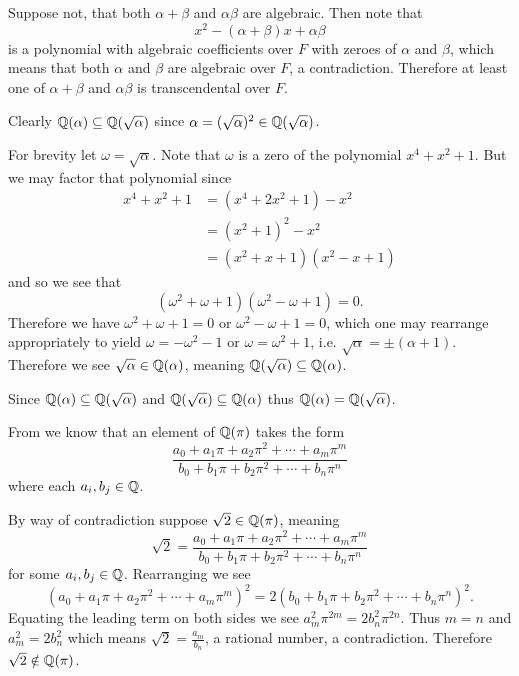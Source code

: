 \begin{questions}
\begin{partquestions}{\roman*}
        \item Suppose not, that both $\alpha + \beta$ and $\alpha\beta$ are algebraic. Then note that
        \[
            x^2 - (\alpha+\beta)x + \alpha\beta
        \]
        is a polynomial with algebraic coefficients over $F$ with zeroes of $\alpha$ and $\beta$, which means that both $\alpha$ and $\beta$ are algebraic over $F$, a contradiction. Therefore at least one of $\alpha + \beta$ and $\alpha\beta$ is transcendental over $F$.
    \end{partquestions}

    \item Clearly $\mathbb{Q}(\alpha) \subseteq \mathbb{Q}(\sqrt\alpha)$ since $\alpha = (\sqrt\alpha)^2 \in \mathbb{Q}(\sqrt\alpha)$.

    For brevity let $\omega = \sqrt\alpha$. Note that $\omega$ is a zero of the polynomial $x^4+x^2+1$. But we may factor that polynomial since
    \begin{align*}
        x^4 + x^2 + 1 &= (x^4 + 2x^2 + 1) - x^2\\
        &= (x^2+1)^2 - x^2\\
        &= (x^2+x+1)(x^2-x+1)
    \end{align*}
    and so we see that
    \[
        (\omega^2+\omega+1)(\omega^2-\omega+1) = 0.
    \]
    Therefore we have $\omega^2+\omega+1 = 0$ or $\omega^2-\omega+1 = 0$, which one may rearrange appropriately to yield $\omega = -\omega^2-1$ or $\omega = \omega^2 + 1$, i.e. $\sqrt\alpha = \pm(\alpha+1)$. Therefore we see $\sqrt\alpha \in \mathbb{Q}(\alpha)$, meaning $\mathbb{Q}(\sqrt\alpha) \subseteq \mathbb{Q}(\alpha)$.

    Since $\mathbb{Q}(\alpha) \subseteq \mathbb{Q}(\sqrt\alpha)$ and $\mathbb{Q}(\sqrt\alpha) \subseteq \mathbb{Q}(\alpha)$ thus $\mathbb{Q}(\alpha) = \mathbb{Q}(\sqrt\alpha)$.

    \item From  we know that an element of $\mathbb{Q}(\pi)$ takes the form
    \[
        \frac{a_0 + a_1\pi + a_2\pi^2 + \cdots + a_m\pi^m}{b_0 + b_1\pi + b_2\pi^2 + \cdots + b_n\pi^n}
    \]
    where each $a_i, b_j \in \mathbb{Q}$.

    By way of contradiction suppose $\sqrt2 \in \mathbb{Q}(\pi)$, meaning
    \[
        \sqrt2 = \frac{a_0 + a_1\pi + a_2\pi^2 + \cdots + a_m\pi^m}{b_0 + b_1\pi + b_2\pi^2 + \cdots + b_n\pi^n}
    \]
    for some $a_i, b_j \in \mathbb{Q}$. Rearranging we see
    {
        \fontsize{9pt}{11pt}
        \[
            \left(a_0 + a_1\pi + a_2\pi^2 + \cdots + a_m\pi^m\right)^2 = 2\left(b_0 + b_1\pi + b_2\pi^2 + \cdots + b_n\pi^n\right)^2.
        \]
    }
    Equating the leading term on both sides we see $a_m^2\pi^{2m} = 2b_n^2\pi^{2n}$. Thus $m = n$ and $a_m^2 = 2b_n^2$ which means $\sqrt2 = \frac{a_m}{b_n}$, a rational number, a contradiction. Therefore $\sqrt2 \notin \mathbb{Q}(\pi)$.


\end{questions}
